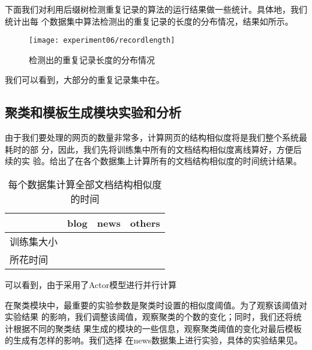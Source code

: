 下面我们对利用后缀树检测重复记录的算法的运行结果做一些统计。具体地，我们统计出每
个数据集中算法检测出的重复记录的长度的分布情况，结果如所示。%
\begin{figure}[hb]
  \centering
  \texttt{[image: experiment06/recordlength]}
  \caption{检测出的重复记录长度的分布情况}
  \label{experiment:fig:recordlength}
\end{figure}

我们可以看到，大部分的重复记录集中在。%

\subsection{聚类和模板生成模块实验和分析}
由于我们要处理的网页的数量非常多，计算网页的结构相似度将是我们整个系统最耗时的部
分，因此，我们先将训练集中所有的文档结构相似度离线算好，方便后续的实
验。给出了在各个数据集上计算所有的文档结构相似度的时间统计结果。 %
\begin{table}[h]
  \centering
\begin{tabular}{llll}
  \toprule
 & blog & news & others \\
\hline
训练集大小 &  &  &  \\
所花时间 &  &  &  \\
\bottomrule
\end{tabular}
\caption{每个数据集计算全部文档结构相似度的时间}
\label{experiment:tab:calcsim}
\end{table}
\begin{comment}
#+ORGTBL: SEND 计算时间 orgtbl-to-latex :splice nil :skip 0
|            | blog | news | others |
|------------+------+------+--------|
| 训练集大小 |      |      |        |
| 所花时间   |      |      |        |
\end{comment}

可以看到，由于采用了Actor模型进行并行计算%

在聚类模块中，最重要的实验参数是聚类时设置的相似度阈值。为了观察该阈值对实验结果
的影响，我们调整该阈值，观察聚类的个数的变化；同时，我们还将统计根据不同的聚类结
果生成的模块的一些信息，观察聚类阈值的变化对最后模板的生成有怎样的影响。我们选择
在news数据集上进行实验，具体的实验结果见。%


